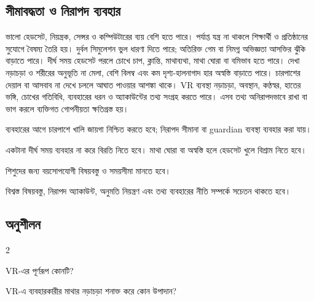 \begin{topicbody}
\subsection{সীমাবদ্ধতা ও নিরাপদ ব্যবহার}
ভালো হেডসেট, নিয়ন্ত্রক, সেন্সর ও কম্পিউটারের ব্যয় বেশি হতে পারে। পর্যাপ্ত যন্ত্র না থাকলে শিক্ষার্থী ও প্রতিষ্ঠানের সুযোগে বৈষম্য তৈরি হয়। দুর্বল সিমুলেশন ভুল ধারণা দিতে পারে; অতিরিক্ত গেম বা নিমগ্ন অভিজ্ঞতা আসক্তির ঝুঁকি বাড়াতে পারে।
দীর্ঘ সময় হেডসেট পরলে চোখে চাপ, ক্লান্তি, মাথাব্যথা, মাথা ঘোরা বা বমিভাব হতে পারে। দেখা নড়াচড়া ও শরীরের অনুভূতি না মেলা, বেশি বিলম্ব এবং কম দৃশ্য-হালনাগাদ হার অস্বস্তি বাড়াতে পারে। চারপাশের দেয়াল বা আসবাব না দেখে চললে আঘাত পাওয়ার আশঙ্কা থাকে।
VR ব্যবস্থা নড়াচড়া, অবস্থান, কণ্ঠস্বর, হাতের ভঙ্গি, চোখের গতিবিধি, ব্যবহারের ধরন ও অ্যাকাউন্টের তথ্য সংগ্রহ করতে পারে। এসব তথ্য অনিরাপদভাবে রাখা বা ভাগ করলে ব্যক্তিগত গোপনীয়তা ক্ষতিগ্রস্ত হয়।
\begin{compactpoints}
\item ব্যবহারের আগে চারপাশে খালি জায়গা নিশ্চিত করতে হবে; নিরাপদ সীমানা বা guardian ব্যবস্থা ব্যবহার করা যায়।
\item একটানা দীর্ঘ সময় ব্যবহার না করে বিরতি নিতে হবে। মাথা ঘোরা বা অস্বস্তি হলে হেডসেট খুলে বিশ্রাম নিতে হবে।
\item শিশুদের জন্য বয়সোপযোগী বিষয়বস্তু ও সময়সীমা মানতে হবে।
\item বিশ্বস্ত বিষয়বস্তু, নিরাপদ অ্যাকাউন্ট, অনুমতি নিয়ন্ত্রণ এবং তথ্য ব্যবহারের নীতি সম্পর্কে সচেতন থাকতে হবে।
\end{compactpoints}
\subsection{অনুশীলন}

\begin{multicols}{2}\begin{compactenum}
\item \begin{minipage}[t]{\linewidth}VR-এর পূর্ণরূপ কোনটি?\par {}\par\end{minipage}

\item \begin{minipage}[t]{\linewidth}VR-এ ব্যবহারকারীর মাথার নড়াচড়া শনাক্ত করে কোন উপাদান?\par {}\par\end{minipage}


\end{compactenum}
\end{multicols}
\end{topicbody}
